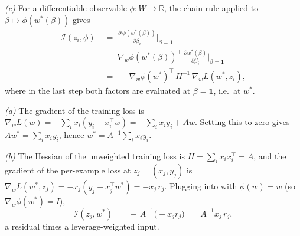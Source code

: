 \begin{solution}[ex:if-derive]
\textit{(c)} For a differentiable observable $\phi:W\to\mathbb{R}$, the chain rule applied to $\beta\mapsto\phi(w^*(\beta))$ gives
\begin{align*}
  \mathcal{I}(z_i,\phi) &\;=\; \frac{\partial\,\phi(w^*(\beta))}{\partial \beta_i}\bigg\rvert_{\beta=\mathbf{1}} \\
  &\;=\; \nabla_w\phi(w^*(\beta))^\top\,\frac{\partial w^*(\beta)}{\partial \beta_i}\bigg\rvert_{\beta=\mathbf{1}} \\
  &\;=\; -\,\nabla_w\phi(w^*)^\top\,H^{-1}\,\nabla_w L(w^*,z_i),
\end{align*}
where in the last step both factors are evaluated at $\beta = \mathbf{1}$, i.e.\ at $w^*$.

\end{solution}

\begin{solution}[ex:ols-if]

\textit{(a)} The gradient of the training loss is $\nabla_w L(w) = -\sum_i x_i(y_i - x_i^\top w) = -\sum_i x_i y_i + Aw$. Setting this to zero gives $Aw^* = \sum_i x_i y_i$, hence $w^* = A^{-1}\sum_i x_i y_i$.

\textit{(b)} The Hessian of the unweighted training loss is $H = \sum_i x_i x_i^\top = A$, and the gradient of the per-example loss at $z_j = (x_j,y_j)$ is $\nabla_w L(w^*, z_j) = -x_j(y_j - x_j^\top w^*) = -x_j\,r_j$. Plugging into  with $\phi(w) = w$ (so $\nabla_w\phi(w^*) = I$),
\[
  \mathcal{I}(z_j, w^*) \;=\; -\,A^{-1}\bigl(-x_j r_j\bigr) \;=\; A^{-1} x_j\,r_j,
\]
a residual times a leverage-weighted input.


\end{solution}
